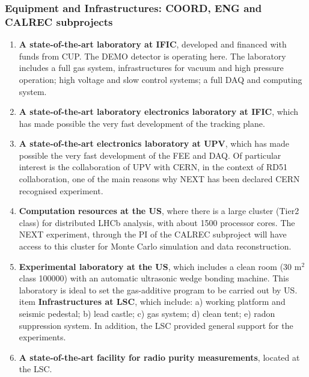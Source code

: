 %
%

\subsubsection*{Equipment and Infrastructures: COORD, ENG and CALREC subprojects}

\begin{enumerate}
\item {\bf A state-of-the-art laboratory at IFIC}, developed and financed with funds from CUP. The DEMO detector is operating here. The laboratory includes a full gas system, infrastructures for vacuum and high pressure operation; high voltage and slow control systems; a full DAQ and computing system. 
\item {\bf A state-of-the-art laboratory electronics laboratory at IFIC}, which has made possible the very fast development of the tracking plane. 
\item {\bf A state-of-the-art electronics laboratory at UPV}, which has made possible the very fast development of the FEE and DAQ. Of particular interest is the collaboration of UPV with CERN, in the context of RD51 collaboration, one of the main reasons why NEXT has been declared CERN recognised experiment.
\item {\bf Computation resources at the US}, where there is a large cluster (Tier2 class) 
for distributed LHCb analysis, with about 1500 processor cores. The NEXT experiment, through the PI of the CALREC subproject will have access to this cluster for Monte Carlo simulation and data reconstruction. 
\item {\bf Experimental laboratory at the US}, which 
includes a clean room (30 m$^2$ class 100000) with an automatic ultrasonic wedge bonding machine. This laboratory is ideal to set the gas-additive program to be carried out by US. 
item {\bf Infrastructures at LSC}, which include: a) working platform and seismic pedestal; b) lead castle; c) gas system; d) clean tent; e) radon suppression system. In addition, the LSC provided general support for the experiments. 
\item {\bf A state-of-the-art facility for radio purity measurements}, located at the LSC. 
\end{enumerate}

